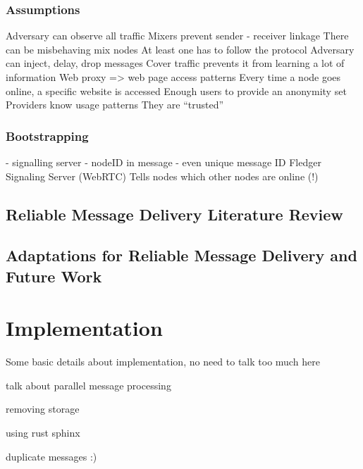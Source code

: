 \documentclass[a4paper,11pt,oneside]{report}
\begin{document}
\subsection{Assumptions}
Adversary can observe all traffic
Mixers prevent sender - receiver linkage
There can be misbehaving mix nodes
At least one has to follow the protocol
Adversary can inject, delay, drop messages
Cover traffic prevents it from learning a lot of information
Web proxy => web page access patterns
Every time a node goes online, a specific website is accessed
Enough users to provide an anonymity set
Providers know usage patterns
They are “trusted”

\subsection{Bootstrapping}
- signalling server
- nodeID in message
- even unique message ID
Fledger Signaling Server (WebRTC)
Tells nodes which other nodes are online (!)

\section{Reliable Message Delivery Literature Review}

\section{Adaptations for Reliable Message Delivery and Future Work}

\chapter{Implementation}



Some basic details about implementation, no need to talk too much here

talk about parallel message processing

removing storage

using rust sphinx

duplicate messages :)
\end{document}
